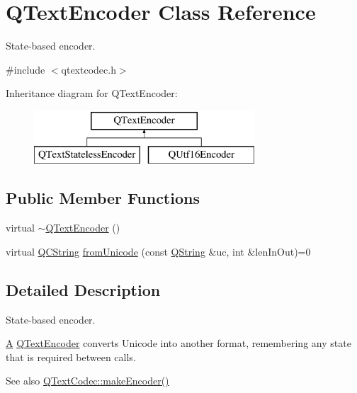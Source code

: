 \hypertarget{class_q_text_encoder}{}\section{Q\+Text\+Encoder Class Reference}
\label{class_q_text_encoder}


State-\/based encoder.  




{\ttfamily \#include $<$qtextcodec.\+h$>$}

Inheritance diagram for Q\+Text\+Encoder\+:\begin{figure}[H]
\begin{center}
\leavevmode
\includegraphics[height=2.000000cm]{class_q_text_encoder}
\end{center}
\end{figure}
\subsection*{Public Member Functions}
\begin{DoxyCompactItemize}
\item 
virtual \mbox{\hyperlink{class_q_text_encoder_ad4aeae820b76fb14a7f5d411ba424b7a}{$\sim$\+Q\+Text\+Encoder}} ()
\item 
virtual \mbox{\hyperlink{class_q_c_string}{Q\+C\+String}} \mbox{\hyperlink{class_q_text_encoder_a3b199427ee9b7f862fe65811165dbbfa}{from\+Unicode}} (const \mbox{\hyperlink{class_q_string}{Q\+String}} \&uc, int \&len\+In\+Out)=0
\end{DoxyCompactItemize}


\subsection{Detailed Description}
State-\/based encoder. 

\mbox{\hyperlink{class_a}{A}} \mbox{\hyperlink{class_q_text_encoder}{Q\+Text\+Encoder}} converts Unicode into another format, remembering any state that is required between calls.

\begin{DoxySeeAlso}{See also}
\mbox{\hyperlink{class_q_text_codec_aa7dccd7fc1b578de0b7599b040d98e11}{Q\+Text\+Codec\+::make\+Encoder()}} 
\end{DoxySeeAlso}



